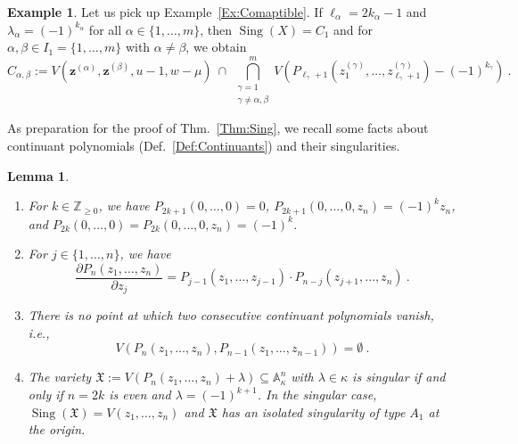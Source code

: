 \documentclass[letter,11pt]{amsart}
\renewcommand{\AA}{\ensuremath{\mathbb{A}}}
\newcommand{\ZZ}{\ensuremath{\mathbb{Z}}}
\DeclareMathOperator{\Sing}{Sing}
\newcommand{\z}{\boldsymbol{z}}
\theoremstyle{theorem}
\newtheorem{lemma}[Thm]{Lemma}
\theoremstyle{definition}
\newtheorem{example}[Thm]{Example}
\newcommand{\len}{\ell}
\newcommand{\halflen}{k}
\numberwithin{equation}{section}
\begin{document}
\begin{example}
	Let us pick up Example~\ref{Ex:Comaptible}. 
		If  $ \ell_\alpha = 2 k_\alpha - 1 $ 
		and $ \lambda_\alpha = (-1)^{k_\alpha} $
		for all $ \alpha \in \{ 1 , \ldots, m \} $,
		then 
		$ \Sing(X) = C_1 $ and 
		for $ \alpha, \beta \in I_1 = \{ 1, \ldots, m \} $ with $ \alpha \neq \beta $, 
		we obtain 
		\[
		C_{\alpha,\beta}
		:=
		V (
		\z^{(\alpha)}, 
		\z^{(\beta)}, 
		u - 1, 
		w - \mu 	) 	 
		\ \cap \
		\bigcap_{\substack{\gamma = 1 \\ \gamma \neq \alpha,\beta}}^m 
		V ( P_{\len_\gamma +1} ( z_1^{(\gamma)}, \ldots, z_{\len_\gamma + 1}^{(\gamma)} ) 
		- (-1)^{k_\gamma} )
		\ .
		\]
\end{example}


As preparation for the proof of Thm.~\ref{Thm:Sing}, we recall some facts about continuant polynomials
(Def.~\ref{Def:Continuants}) and their singularities.


 
\begin{lemma}
	\label{Lem:ResultsContinuants}
	\begin{enumerate}[(1)]
		\item\label{Lem:ResultsContinuants_Pn(0)} 
		For $ k \in \ZZ_{\geq 0} $,
		we have
		$ P_{2k+1} (0, \ldots, 0 ) = 0 $,
		$ P_{2k+1} (0, \ldots, 0, z_n ) = (-1)^k z_n $,
		and $ P_{2k} (0, \ldots, 0) = P_{2k} (0, \ldots, 0, z_n) = (-1)^k $.
		
		\item\label{Lem:ResultsContinuants_deriv}
		\color{black} 
		For $ j \in \{ 1, \ldots, n \} $, we have
		\[
			\frac{\partial P_n(z_1, \ldots, z_n)}{\partial z_j} 
			= P_{j-1}(z_1, \ldots, z_{j-1})\cdot P_{n-j}(z_{j+1}, \ldots, z_n) 
			\ .
		\]
		
		\item\label{Lem:ResultsContinuants_consecutive} 
		There is no point at which two consecutive continuant polynomials vanish, i.e.,
		\[  
			V ( P_n (z_1, \ldots, z_n), P_{n-1} (z_1, \ldots, z_{n-1}) ) = \emptyset 
			\ .
		\]
		
		
		\item\label{Lem:ResultsContinuants_singu} 
		The variety $ \mathfrak X := V(P_n (z_1, \ldots, z_n ) + \lambda) \subseteq \AA_\kappa^n $ with $ \lambda \in \kappa $ is singular if and only if
		$ n = 2 \halflen $ is even and $ \lambda = (-1)^{\halflen+1} $.
		In the singular case,  $ \Sing ( \mathfrak{X} ) = V (z_1, \ldots, z_n )  $ and $  \mathfrak{X} $ has an isolated singularity of type $ A_1 $ at the origin.   
	\end{enumerate}
\end{lemma}
\end{document}
